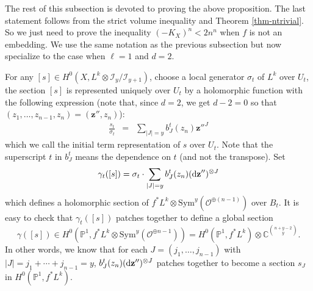 \documentclass[12pt]{amsart}
\theoremstyle{definition}
\def\dif{{\rm d}}
\def\bz{{\mathbf{z}}}
\newcommand{\IC}{{\mathbb C}}
\newcommand{\IP}{{\mathbb P}}
\newcommand{\CI}{{\mathcal I}}
\newcommand{\CO}{{\mathcal O}}
\begin{document}
The rest of this subsection is devoted to proving the above proposition. The last statement follows from the strict volume inequality and Theorem \ref{thm-ntrivial}. So we just need to prove the inequality $(-K_X)^n< 2n^n$ when $f$ is not an embedding. We use the same notation as the previous subsection but now specialize to the case when $\ell=1$ and $d=2$. 


For any $[s]\in H^0(X, L^k\otimes \CI_y/\CI_{y+1})$, choose a local generator $\sigma_t$ of $L^k$ over $U_t$, the section $[s]$ is represented uniquely over $U_t$ by a holomorphic function with the following expression (note that, since $d=2$, we get $d-2=0$ so that $(z_1,\dots, z_{n-1}, z_n)=(\bz'', z_n)$): 
\begin{eqnarray*}
    \frac{s_t}{\sigma_t}&=&\sum_{|J|=y}b^t_{J}(z_n) \bz''^J
\end{eqnarray*}
which we call the initial term representation of $s$ over $U_t$. 
Note that the superscript $t$ in $b^t_J$ means the dependence on $t$ (and not the transpose). 
Set
\begin{equation*}    \gamma_t([s])=\sigma_t\cdot \sum_{|J|=y}b^t_{J}(z_n) (\dif\bz'')^{\otimes J}
\end{equation*}
which defines a holomorphic section of $f^*L^k\otimes \mathrm{Sym}^{y}(\CO^{\oplus (n-1)})$ over $B_t$. It is easy to check that $\gamma_t([s])$ patches together to define a global section $$\gamma([s])\in H^0(\IP^1, f^*L^k\otimes \mathrm{Sym}^y (\CO^{\oplus n-1}))= H^0(\IP^1, f^*L^k)\otimes \IC^{\binom{n+y-2}{y}}.
$$
In other words, we know that for each $J=(j_1,\dots, j_{n-1})$ with $|J|=j_1+\cdots+j_{n-1}=y$, 
$b_J^t(z_n)(\dif\bz'')^{\otimes J}$ patches together to become a section $s_J$ in $H^0(\IP^1, f^*L^k)$. 
\end{document}
